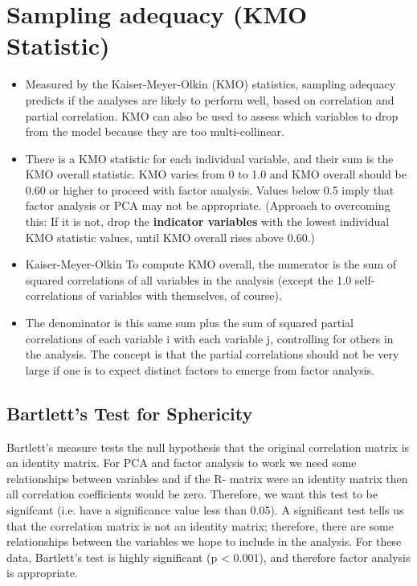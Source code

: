 \documentclass[pca-main.tex]{subfiles}
\begin{document}
 
	\newpage


\section{Sampling adequacy (KMO Statistic)}
\begin{itemize}
	\item	
	Measured by the Kaiser-Meyer-Olkin (KMO) statistics, sampling adequacy predicts if the analyses are likely to perform well, based on correlation and partial correlation. KMO can also be used to assess which variables to drop from the model because they are too multi-collinear.
	\item
	There is a KMO statistic for each individual variable, and their sum is the KMO overall statistic. KMO varies from 0 to 1.0 and KMO overall should be 0.60 or higher to proceed with factor analysis. Values below 0.5 imply that factor analysis or PCA may not be appropriate. (Approach to overcoming this: If it is not, drop the \textbf{indicator variables} with the lowest individual KMO statistic values, until KMO overall rises above 0.60.)
	\item
	Kaiser-Meyer-Olkin
	To compute KMO overall, the numerator is the sum of squared correlations of all variables in the analysis (except the 1.0 self-correlations of variables with themselves, of course). 
	\item The denominator is this same sum plus the sum of squared partial correlations of each variable i with each variable j, controlling for others in the analysis. The concept is that the partial correlations should not be very large if one is to expect distinct factors to emerge from factor analysis.
\end{itemize}
\subsection{Bartlett's Test for Sphericity}
Bartlett's measure tests the null hypothesis that the original correlation matrix is an identity
matrix. For PCA and factor analysis to work we need some relationships between variables and if the R-
matrix were an identity matrix then all correlation coefficients would be zero. Therefore, we
want this test to be signifcant (i.e. have a significance value less than 0.05). A significant test
tells us that the correlation matrix is not an identity matrix; therefore, there are some relationships
between the variables we hope to include in the analysis. For these data, Bartlett's test is
highly significant (p < 0.001), and therefore factor analysis is appropriate.
\end{document}
